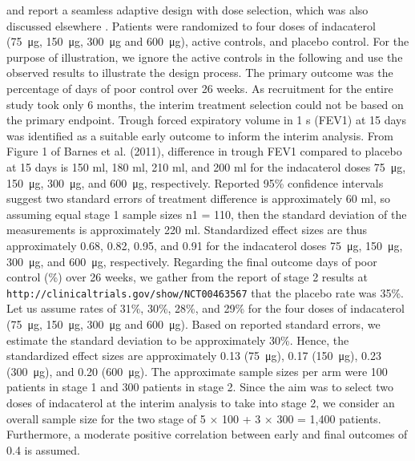 \documentclass[bimj,fleqn]{w-art}
\theoremstyle{plain}
\theoremstyle{definition}
\begin{document}
\citet{barnes_integrating_2010} and \citet{donohue_oncedaily_2010} report a seamless adaptive design with dose selection, which was also discussed elsewhere \citep{cuffe_when_2014}. %
Patients were randomized to four doses of indacaterol (\SI{75}{\micro\gram}, \SI{150}{\micro\gram}, \SI{300}{\micro\gram} and \SI{600}{\micro\gram}), active controls, and placebo control. %
For the purpose of illustration, we ignore the active controls in the following and use the observed results to illustrate the design process. %
The primary outcome was the percentage of days of poor control over 26 weeks. %
As recruitment for the entire study took only 6 months, the interim treatment selection could not be based on the primary endpoint. %
Trough forced expiratory volume in 1 s (FEV1) at 15 days was identified as a suitable early outcome to inform the interim analysis. %
From Figure 1 of Barnes et al. (2011), difference in trough FEV1 compared to placebo at 15 days is 150 ml, 180 ml, 210 ml, and 200 ml for the indacaterol doses \SI{75}{\micro\gram}, \SI{150}{\micro\gram}, \SI{300}{\micro\gram}, and \SI{600}{\micro\gram}, respectively.%
Reported 95\% confidence intervals suggest two standard errors of treatment difference is approximately 60 ml, so assuming equal stage 1 sample sizes n1 = 110, then the standard deviation of the measurements is approximately 220 ml. %
Standardized effect sizes are thus approximately 0.68, 0.82, 0.95, and 0.91 for the indacaterol doses \SI{75}{\micro\gram}, \SI{150}{\micro\gram}, \SI{300}{\micro\gram}, and \SI{600}{\micro\gram}, respectively. %
Regarding the final outcome days of poor control (\%) over 26 weeks, we gather from the report of stage 2 results at \texttt{http://clinicaltrials.gov/show/NCT00463567} that the placebo rate was 35\%. %
Let us assume rates of 31\%, 30\%, 28\%, and 29\% for the four doses of indacaterol (\SI{75}{\micro\gram}, \SI{150}{\micro\gram}, \SI{300}{\micro\gram} and \SI{600}{\micro\gram}). %
Based on reported standard errors, we estimate the standard deviation to be approximately 30\%. Hence, the standardized effect sizes are approximately 0.13 (\SI{75}{\micro\gram}), 0.17 (\SI{150}{\micro\gram}), 0.23 (\SI{300}{\micro\gram}), and 0.20 (\SI{600}{\micro\gram}). %
The approximate sample sizes per arm were 100 patients in stage 1 and 300 patients in stage 2.%
Since the aim was to select two doses of indacaterol at the interim analysis to take into stage 2, we consider an overall sample size for the two stage of 5 × 100 + 3 × 300 = 1,400 patients. Furthermore, a moderate positive correlation between early and final outcomes of 0.4 is assumed.%
\end{document}
